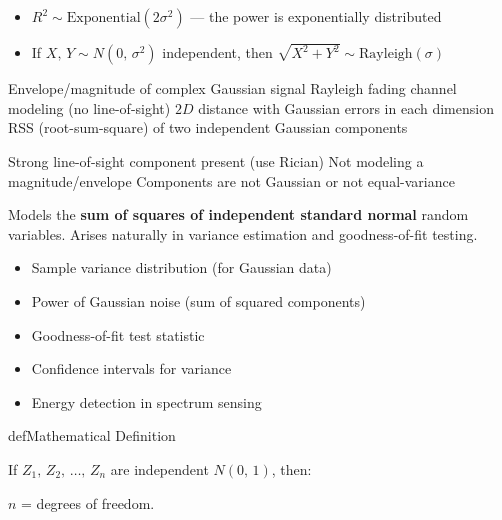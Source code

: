 
\begin{itemize}
\tightlist
\item
  $R^{2} \sim \mathrm{Exponential}(2\sigma^{2})$ — the power is exponentially distributed
\item
  If $X,\, Y \sim N(0,\, \sigma^{2})$ independent, then $\sqrt{X^{2}+Y^{2}} \sim \mathrm{Rayleigh}(\sigma)$
\end{itemize}


\PSyes{} Envelope/magnitude of complex Gaussian signal\PSbr{}\PSyes{} Rayleigh fading channel modeling (no line-of-sight)\PSbr{}\PSyes{} $2D$ distance with Gaussian errors in each dimension\PSbr{}\PSyes{} RSS (root-sum-square) of two independent Gaussian components


\PSno{} Strong line-of-sight component present (use Rician)\PSbr{}\PSno{} Not modeling a magnitude/envelope\PSbr{}\PSno{} Components are not Gaussian or not equal-variance



Models the \textbf{sum of squares of independent standard normal} random variables. Arises naturally in variance estimation and goodness-of-fit testing.


\begin{itemize}
\tightlist
\item
  Sample variance distribution (for Gaussian data)
\item
  Power of Gaussian noise (sum of squared components)
\item
  Goodness-of-fit test statistic
\item
  Confidence intervals for variance
\item
  Energy detection in spectrum sensing
\end{itemize}

\begin{PSbox}[unbreakable]{def}{Mathematical Definition}

If $Z_{1},\, Z_{2},\, \ldots,\, Z_{n}$ are independent $N(0,\,1)$, then:

$n$ = degrees of freedom.

\end{PSbox}

